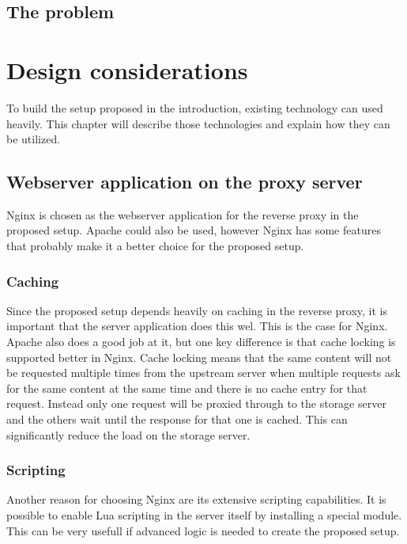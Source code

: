 \documentclass[twoside,openright]{uva-bachelor-thesis}
\begin{document}
\section{The problem}







\chapter{Design considerations}
To build the setup proposed in the introduction, existing technology can used
heavily. This chapter will describe those technologies and explain how they can
be utilized.


\section{Webserver application on the proxy server}
Nginx is chosen as the webserver application for the reverse proxy in the
proposed setup. Apache could also be used, however Nginx has some features that
probably make it a better choice for the proposed setup.

\subsection{Caching}\label{sec:caching}
Since the proposed setup depends heavily on caching in the reverse proxy, it is
important that the server application does this wel. This is the case for Nginx.
Apache also does a good job at it, but one key difference is that cache locking is
supported better in Nginx. Cache locking means that the same content will not be
requested multiple times from the upstream server when multiple requests ask for
the same content at the same time and there is no cache entry for that
request. Instead only one request will be proxied through to the storage server
and the others wait until the response for that one is cached. This can
significantly reduce the load on the storage server.

\subsection{Scripting}
Another reason for choosing Nginx are its extensive scripting capabilities. It
is possible to enable Lua scripting in the server itself by installing a special
module\autocite{nginxlua}. This can be very usefull if advanced logic is needed
to create the proposed setup.
\end{document}
